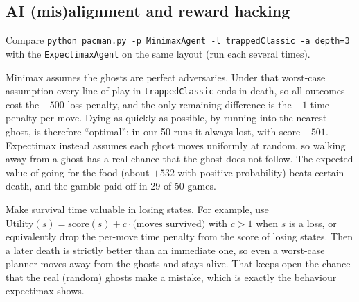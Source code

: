 \subsection{AI (mis)alignment and reward hacking}

Compare \texttt{python pacman.py -p MinimaxAgent -l trappedClassic -a depth=3} with the
\texttt{ExpectimaxAgent} on the same layout (run each several times).

\begin{solution}
Minimax assumes the ghosts are perfect adversaries. Under that worst-case assumption every line of play in
\texttt{trappedClassic} ends in death, so all outcomes cost the $-500$ loss penalty, and the only remaining
difference is the $-1$ time penalty per move. Dying as quickly as possible, by running into the nearest ghost, is
therefore ``optimal'': in our 50 runs it always lost, with score $-501$. Expectimax instead assumes each ghost moves
uniformly at random, so walking away from a ghost has a real chance that the ghost does not follow. The expected
value of going for the food (about $+532$ with positive probability) beats certain death, and the gamble paid off
in 29 of 50 games.
\end{solution}

\begin{solution}
Make survival time valuable in losing states. For example, use
$\text{Utility}(s)=\text{score}(s)+c\cdot\text{(moves survived)}$ with $c>1$ when $s$ is a loss, or equivalently
drop the per-move time penalty from the score of losing states. Then a later death is strictly better than an
immediate one, so even a worst-case planner moves away from the ghosts and stays alive. That keeps open the chance
that the real (random) ghosts make a mistake, which is exactly the behaviour expectimax shows.
\end{solution}

